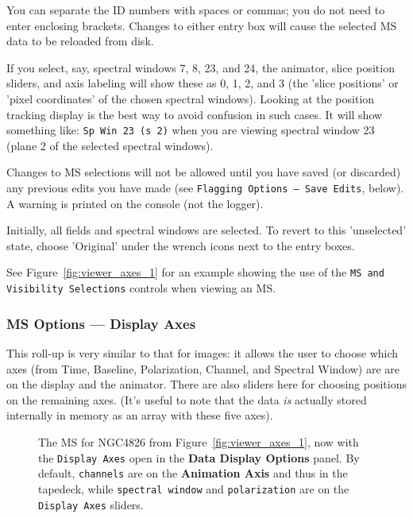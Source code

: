 You can separate the ID numbers with spaces or commas; you do not need to
enter enclosing brackets.  Changes to either entry box will cause
the selected MS data to be reloaded from disk.

If you select, say, spectral windows 7, 8, 23, and 24, the animator, slice
position sliders, and axis labeling will show 
these as 0, 1, 2, and 3 (the 'slice positions' or 'pixel coordinates' of the
chosen spectral windows).  Looking at the position tracking display is the best
way to avoid confusion in such cases.  It will show something like: 
{\tt Sp Win 23 (s 2)} when you are viewing spectral window 23 (plane 2
of the selected spectral windows).

Changes to MS selections will not be allowed until you have saved
(or discarded) any previous edits you have made (see {\tt Flagging Options 
-- Save Edits}, below).  A warning is printed on the console (not the logger).

Initially, all fields and spectral windows are selected.  To revert to
this 'unselected' state, choose 'Original' under the wrench
icons next to the entry boxes.

See Figure~\ref{fig:viewer_axes_1} for an example showing the use
of the {\tt MS and Visibility Selections} controls when 
viewing an MS.

\subsubsection{MS Options --- Display Axes}
\label{section:display.ms.adjust.axes}

This roll-up is very similar to that for images: it allows the user to
choose which axes (from Time, Baseline, Polarization, Channel, and
Spectral Window) are are on the display and the animator.  There are
also sliders here for choosing positions on the remaining axes.  (It's 
useful to note that the data {\it is} actually stored internally in
memory as an array with these five axes).

\begin{figure}[h!]
\begin{center}
\caption{\label{fig:viewer_axes_2} 
The MS for NGC4826 from Figure~\ref{fig:viewer_axes_1}, now with the
{\tt Display Axes} open in the {\bf Data Display Options} panel.  By
default, {\tt channels} are on the {\bf Animation Axis} and thus in
the tapedeck, while {\tt spectral window} and {\tt polarization} are
on the {\tt Display Axes} sliders. } \hrulefill
\end{center}
\end{figure}

